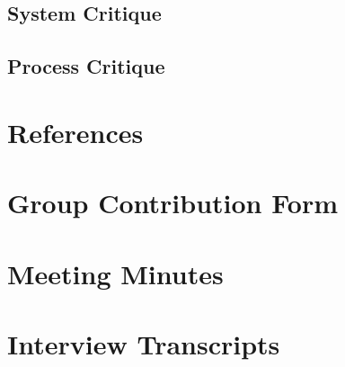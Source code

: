 \documentclass[12pt,a4paper]{article}
\begin{document}
\subsection{System Critique}

\subsection{Process Critique}


\newpage

\section*{References}
% 

\newpage
\appendix

\section{Group Contribution Form}

\section{Meeting Minutes}

\section{Interview Transcripts}
\end{document}
